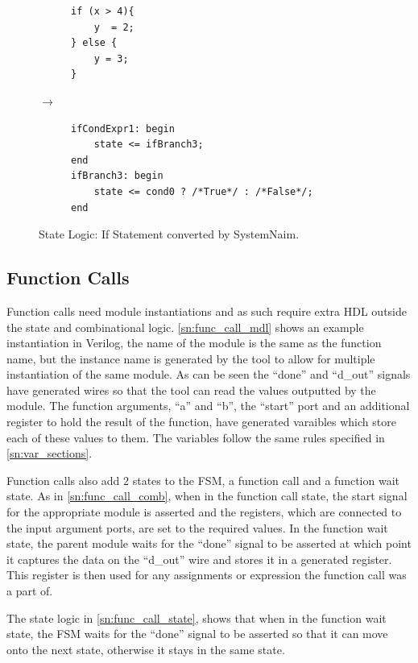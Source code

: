 \begin{figure}[H]
\centering
\begin{subfigure}{0.22\textwidth}
    \centering
    \begin{verbatim}
if (x > 4){
    y  = 2;
} else {
    y = 3;
}
\end{verbatim}
\end{subfigure}%
{\LARGE$\rightarrow$}%
\begin{subfigure}{0.6\textwidth}
    \begin{verbatim}
ifCondExpr1: begin
    state <= ifBranch3;
end
ifBranch3: begin
    state <= cond0 ? /*True*/ : /*False*/;
end
    \end{verbatim}
\end{subfigure}
\caption{State Logic: If Statement converted by SystemNaim.}
\label{sn:if_state}
\end{figure}

\subsection{Function Calls}
\label{sn:func_sec}

Function calls need module instantiations and as such require extra HDL outside the state and combinational logic. \autoref{sn:func_call_mdl} shows an example instantiation in Verilog, the name of the module is the same as the function name, but the instance name is generated by the tool to allow for multiple instantiation of the same module. As can be seen the “done” and “d\_out” signals have generated wires so that the tool can read the values outputted by the module. The function arguments, “a” and “b”, the “start” port and an additional register to hold the result of the function, have generated varaibles which store each of these values to them. The variables follow the same rules specified in \autoref{sn:var_sections}.

Function calls also add 2 states to the FSM, a function call and a function wait state. As in \autoref{sn:func_call_comb}, when in the function call state, the start signal for the appropriate module is asserted and the registers, which are connected to the input argument ports, are set to the required values. In the function wait state, the parent module waits for the “done” signal to be asserted at which point it captures the data on the “d\_out” wire and stores it in a generated register. This register is then used for any assignments or expression the function call was a part of.

The state logic in \autoref{sn:func_call_state}, shows that when in the function wait state, the FSM waits for the “done” signal to be asserted so that it can move onto the next state, otherwise it stays in the same state.


